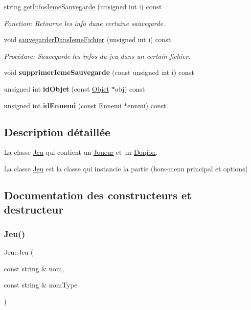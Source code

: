 \begin{DoxyCompactItemize}
string \mbox{\hyperlink{classJeu_aa37d1a48e9f4e8799786128f9a258860}{get\+Infos\+Ieme\+Sauvegarde}} (unsigned int i) const
\begin{DoxyCompactList}\small\item\em Fonction\+: Retourne les info d\textquotesingle{}une certaine sauvegarde. \end{DoxyCompactList}\item 
void \mbox{\hyperlink{classJeu_a46b4527da48e2a41da6b1e3f39ef49f8}{sauvegarder\+Dans\+Ieme\+Fichier}} (unsigned int i) const
\begin{DoxyCompactList}\small\item\em Procédure\+: Sauvegarde les infos du jeu dans un certain fichier. \end{DoxyCompactList}\item 
\mbox{\label{classJeu_a03c30f1a218a7666d6b35d470d599b57}} 
void {\bfseries supprimer\+Ieme\+Sauvegarde} (const unsigned int i) const
\item 
\mbox{\label{classJeu_af8e003244df8b60a767af284239e95c0}} 
unsigned int {\bfseries id\+Objet} (const \mbox{\hyperlink{structObjet}{Objet}} $\ast$obj) const
\item 
\mbox{\label{classJeu_ae50a991ae2a99cf513b0e01c67c828ae}} 
unsigned int {\bfseries id\+Ennemi} (const \mbox{\hyperlink{classEnnemi}{Ennemi}} $\ast$ennmi) const
\end{DoxyCompactItemize}


\subsection{Description détaillée}
La classe \mbox{\hyperlink{classJeu}{Jeu}} qui contient un \mbox{\hyperlink{classJoueur}{Joueur}} et un \mbox{\hyperlink{classDonjon}{Donjon}}. 

La classe \mbox{\hyperlink{classJeu}{Jeu}} est la classe qui instancie la partie (hors-\/menu principal et options) 

\subsection{Documentation des constructeurs et destructeur}
\mbox{\label{classJeu_a0f4f3c83ee5283ffa550099635f992f7}} 
\subsubsection{\texorpdfstring{Jeu()}{Jeu()}\hspace{0.1cm}{\footnotesize\ttfamily [1/2]}}
{\footnotesize\ttfamily Jeu\+::\+Jeu (\begin{DoxyParamCaption}\item[{const string \&}]{nom,  }\item[{const string \&}]{nom\+Type }\end{DoxyParamCaption})}




